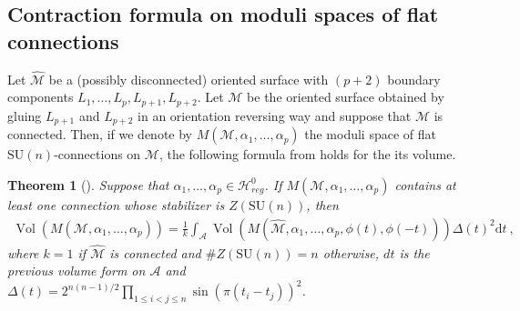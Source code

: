 \documentclass[11pt,a4paper]{amsart}
\providecommand{\diff}{\mathrm d}
\providecommand{\SU}{\mathrm {SU}}
\providecommand{\Vol}{\operatorname{Vol}}
\numberwithin{equation}{section}
\newtheorem{theorem}{Theorem}[section]
\theoremstyle{definition}
\begin{document}
\subsection{Contraction formula on moduli spaces of flat connections} 
\label{subsec:contraction_formulas_flat_co}

Let $\widehat{\mathcal{M}}$ be a (possibly disconnected) oriented surface with $(p+2)$ boundary components 
$L_1,\ldots,L_p,L_{p+1}, L_{p+2}$. Let $\mathcal{M}$ be the oriented surface obtained by gluing $L_{p+1}$ 
and $L_{p+2}$ in an orientation reversing way and suppose that $\mathcal{M}$ is connected. 
Then, if we denote by $M(\mathcal{M},\alpha_1,\ldots,\alpha_p)$ the moduli space of flat $\SU(n)$-connections on $\mathcal{M}$, 
the following formula from \cite{Meinrenken_Woodward} holds for the its volume.

\begin{theorem}[{\autocite[Prop. 5.4]{Meinrenken_Woodward}}]\label{thm:contraction_formula_connection}
Suppose that $\alpha_1,\ldots,\alpha_p\in \mathcal{H}_{reg}^0$. If $M(\mathcal{M},\alpha_1,\ldots,\alpha_p)$ 
contains at least one connection whose stabilizer is $Z(\SU(n))$, then
\begin{align*}
\Vol(M(\mathcal{M},\alpha_1,\ldots,\alpha_p))=\frac{1}{k} 
\int_{\mathcal{A}}\Vol(M(\widehat{\mathcal{M}},\alpha_1,\ldots,\alpha_p,\phi(t),\phi(-t)))\Delta(t)^2 \diff t \ ,
\end{align*}
where $k=1$ if $\widehat{\mathcal{M}}$ is connected and $\#Z(\SU(n))=n$ otherwise, 
$dt$ is the previous volume form on $\mathcal{A}$ and 
$\Delta(t)=2^{n(n-1)/2}\prod_{1\leqslant i<j\leqslant n}\sin\left(\pi(t_i-t_j)\right)^2$.
\end{theorem}
\end{document}
